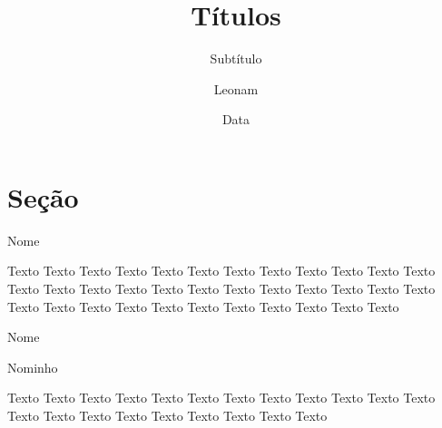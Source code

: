 \documentclass[10pt, handout]{beamer}
\title{Títulos}
\subtitle{Subtítulo}
\date{Data}
\author{
        Leonam 
    }
\institute{CEFET-MG}
\begin{document}
\maketitle

\section{Seção}

\begin{frame}[fragile]{Nome}
    \begin{justify}
        Texto Texto Texto Texto Texto Texto Texto Texto Texto Texto Texto Texto Texto Texto Texto Texto Texto Texto Texto Texto Texto Texto Texto Texto Texto Texto Texto Texto Texto Texto Texto Texto Texto Texto Texto  
    \end{justify}
\end{frame}

\begin{frame}[fragile]{Nome}
    \begin{justify}


        \begin{exampleblock}{Nominho}
        
            Texto Texto Texto Texto Texto Texto Texto Texto Texto Texto Texto Texto Texto Texto Texto Texto Texto Texto Texto Texto Texto
            
        \end{exampleblock}
        
    \end{justify}
\end{frame}
\end{document}
